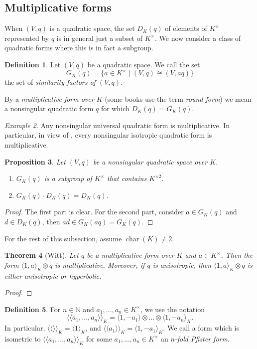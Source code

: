 \documentclass[12pt, leqno, british]{amsart}
\theoremstyle{definition}
\newtheorem{defi}{Definition}[subsection]
\theoremstyle{plain}
\newtheorem{prop}[defi]{Proposition}
\newtheorem{thm}[defi]{Theorem}
\theoremstyle{remark}
\newtheorem{eg}[defi]{Example}
\newcommand{\mbb}{\mathbb}
\newcommand{\nat}{\mbb N}
\DeclareMathOperator{\charac}{char}
\newcommand{\llangle}{\langle\!\langle}
\newcommand{\rrangle}{\rangle\!\rangle}
\begin{document}
\subsection{Multiplicative forms}
When $(V, q)$ is a quadratic space, the set $D_K(q)$ of elements of $K^\times$ represented by $q$ is in general just a subset of $K^\times$.
We now consider a class of quadratic forms where this is in fact a subgroup.
\begin{defi}
Let $(V, q)$ be a quadratic space.
We call the set
$$ G_K(q) = \lbrace a \in K^\times \mid (V, q) \cong (V, aq) \rbrace $$
the set of \emph{similarity factors of $(V, q)$}.

By a \emph{multiplicative form over $K$} (some books use the term \emph{round form}) we mean a nonsingular quadratic form $q$ for which $D_K(q) = G_K(q)$.
\end{defi}
\begin{eg}
Any nonsingular universal quadratic form is multiplicative. In particular, in view of , every nonsingular isotropic quadratic form is multiplicative.
\end{eg}
\begin{prop}
Let $(V, q)$ be a nonsingular quadratic space over $K$.
\begin{enumerate}
\item $G_K(q)$ is a subgroup of $K^\times$ that contains $K^{\times 2}$.
\item $G_K(q) \cdot D_K(q) = D_K(q)$.
\end{enumerate}
\end{prop}
\begin{proof}
The first part is clear.
For the second part, consider $a \in G_K(q)$ and $d \in D_K(q)$, then $ad \in G_K(aq) = G_K(q)$.
\end{proof}
For the rest of this subsection, assume $\charac(K) \neq 2$.
\begin{thm}[Witt]\label{T:Witt-multiplicative-forms}
Let $q$ be a multiplicative form over $K$ and $a \in K^\times$.
Then the form $\langle 1, a \rangle_K \otimes q$ is multiplicative.
Moreover, if $q$ is anisotropic, then $\langle 1, a \rangle_K \otimes q$ is either anisotropic or hyperbolic.
\end{thm}
\begin{proof}
\end{proof}
\begin{defi}
For $n \in \nat$ and $a_1, \ldots, a_n \in K^\times$, we use the notation
$$ \llangle a_1, \ldots, a_n \rrangle_K = \langle 1, -a_1 \rangle \otimes \ldots \otimes \langle 1, -a_n \rangle_K. $$
In particular, $\llangle \rrangle_K = \langle 1 \rangle_K$, and $\llangle a_1 \rrangle_K = \langle 1, -a_1 \rangle_K$.
We call a form which is isometric to $\llangle a_1, \ldots, a_n \rrangle_K$ for some $a_1, \ldots, a_n \in K^\times$ an \emph{$n$-fold Pfister form}.
\end{defi}
\end{document}
